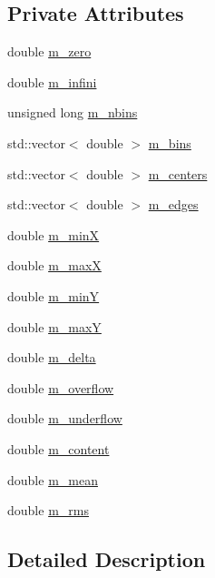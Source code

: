 \subsection*{Private Attributes}
\begin{DoxyCompactItemize}
\item 
double \hyperlink{classHisto1D_ac87bd1971cc300ce6fc1e745785cacb9}{m\+\_\+zero}
\item 
double \hyperlink{classHisto1D_a47c1ba33be0574ca167f43a1b27ba1a0}{m\+\_\+infini}
\item 
unsigned long \hyperlink{classHisto1D_a1913aca9a278b4bfd365f35b85e65d8d}{m\+\_\+nbins}
\item 
std\+::vector$<$ double $>$ \hyperlink{classHisto1D_a7a82923d3938739904469f5aa0a517ca}{m\+\_\+bins}
\item 
std\+::vector$<$ double $>$ \hyperlink{classHisto1D_a0e03676ed176aaad2f615fa84b8ffcd3}{m\+\_\+centers}
\item 
std\+::vector$<$ double $>$ \hyperlink{classHisto1D_a4188c6d1b4bfc8f9d8bde7616b4dbf5b}{m\+\_\+edges}
\item 
double \hyperlink{classHisto1D_af5ce58b20e96fa6e4b306109dd88589e}{m\+\_\+minX}
\item 
double \hyperlink{classHisto1D_a6a5007569e096537f9b7b39d2aad865b}{m\+\_\+maxX}
\item 
double \hyperlink{classHisto1D_a3bb6c3ea23a1af14ebb10af807f3810d}{m\+\_\+minY}
\item 
double \hyperlink{classHisto1D_a28a8995424e36088c47643f8c1a7fa7f}{m\+\_\+maxY}
\item 
double \hyperlink{classHisto1D_a993e2e40b89e257e6f86c0742f6f06b3}{m\+\_\+delta}
\item 
double \hyperlink{classHisto1D_ab60b2ec4e435a3094b7ec218404aa16f}{m\+\_\+overflow}
\item 
double \hyperlink{classHisto1D_a7f475b822f4bbb23209e2e523d228380}{m\+\_\+underflow}
\item 
double \hyperlink{classHisto1D_a75f4abeae577e232f4c012cb6b4049d7}{m\+\_\+content}
\item 
double \hyperlink{classHisto1D_a7e49893543fb5d2af37167690bc0b0ff}{m\+\_\+mean}
\item 
double \hyperlink{classHisto1D_a1331c670df40eb18d8a814f5a15ec7da}{m\+\_\+rms}
\end{DoxyCompactItemize}


\subsection{Detailed Description}


